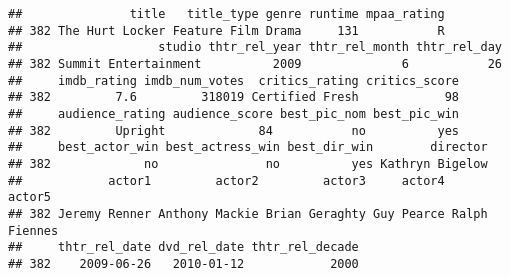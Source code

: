 \documentclass[]{article}
\newenvironment{Shaded}{\begin{snugshade}}{\end{snugshade}}
\newcommand{\KeywordTok}[1]{\textcolor[rgb]{0.13,0.29,0.53}{\textbf{#1}}}
\newcommand{\DataTypeTok}[1]{\textcolor[rgb]{0.13,0.29,0.53}{#1}}
\newcommand{\StringTok}[1]{\textcolor[rgb]{0.31,0.60,0.02}{#1}}
\newcommand{\OperatorTok}[1]{\textcolor[rgb]{0.81,0.36,0.00}{\textbf{#1}}}
\newcommand{\NormalTok}[1]{#1}
\begin{document}
\begin{Shaded}
\end{Shaded}

\begin{verbatim}
##               title   title_type genre runtime mpaa_rating
## 382 The Hurt Locker Feature Film Drama     131           R
##                   studio thtr_rel_year thtr_rel_month thtr_rel_day
## 382 Summit Entertainment          2009              6           26
##     imdb_rating imdb_num_votes  critics_rating critics_score
## 382         7.6         318019 Certified Fresh            98
##     audience_rating audience_score best_pic_nom best_pic_win
## 382         Upright             84           no          yes
##     best_actor_win best_actress_win best_dir_win        director
## 382             no               no          yes Kathryn Bigelow
##            actor1         actor2         actor3     actor4        actor5
## 382 Jeremy Renner Anthony Mackie Brian Geraghty Guy Pearce Ralph Fiennes
##     thtr_rel_date dvd_rel_date thtr_rel_decade
## 382    2009-06-26   2010-01-12            2000
\end{verbatim}

\begin{Shaded}
\end{Shaded}
\end{document}
